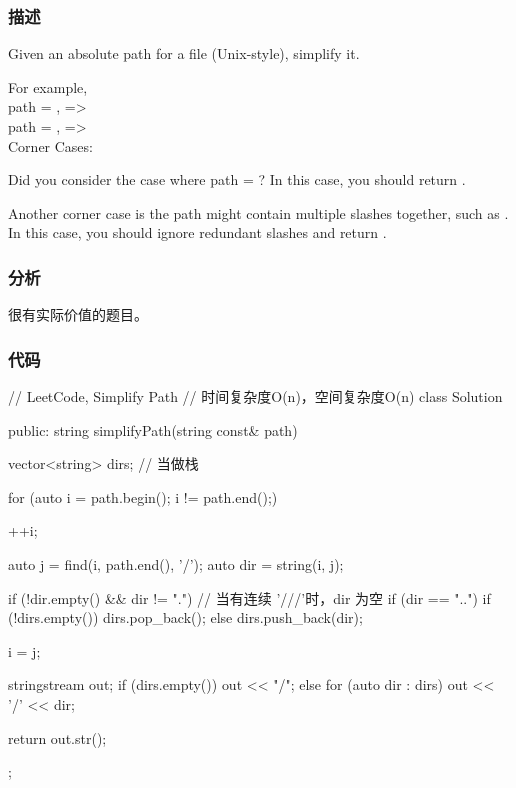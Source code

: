 \subsubsection{描述}
Given an absolute path for a file (Unix-style), simplify it.

For example, \\
path = , =>  \\
path = , =>  \\

Corner Cases:
\begindot
\item Did you consider the case where path = ? 
In this case, you should return .
\item 
Another corner case is the path might contain multiple slashes  together, such as .
In this case, you should ignore redundant slashes and return .
\myenddot


\subsubsection{分析}
很有实际价值的题目。


\subsubsection{代码}
\begin{Code}
// LeetCode, Simplify Path
// 时间复杂度O(n)，空间复杂度O(n)
class Solution {
public:
    string simplifyPath(string const& path) {
        vector<string> dirs; // 当做栈

        for (auto i = path.begin(); i != path.end();) {
            ++i;

            auto j = find(i, path.end(), '/');
            auto dir = string(i, j);

            if (!dir.empty() && dir != ".") {// 当有连续 '///'时，dir 为空
                if (dir == "..") {
                    if (!dirs.empty())
                        dirs.pop_back();
                } else
                    dirs.push_back(dir);
            }

            i = j;
        }

        stringstream out;
        if (dirs.empty()) {
            out << "/";
        } else {
            for (auto dir : dirs)
                out << '/' << dir;
        }

        return out.str();
    }
};
\end{Code}


